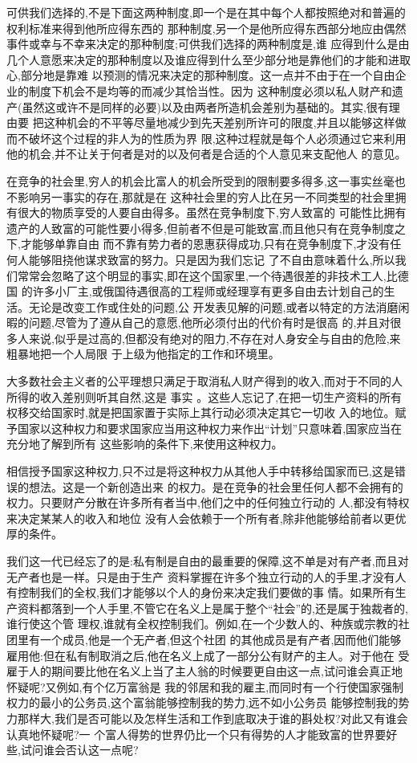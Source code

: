 ﻿\documentclass[12pt]{article}
\begin{document}
可供我们选择的,不是下面这两种制度,即一个是在其中每个人都按照绝对和普遍的权利标准来得到他所应得东西的
那种制度,另一个是他所应得东西部分地应由偶然事件或幸与不幸来决定的那种制度;可供我们选择的两种制度是,谁
应得到什么是由几个人意愿来决定的那种制度以及谁应得到什么至少部分地是靠他们的才能和进取心,部分地是靠难
以预测的情况来决定的那种制度。这一点并不由于在一个自由企业的制度下机会不是均等的而减少其恰当性。因为
这种制度必须以私人财产和遗产(虽然这或许不是同样的必要)以及由两者所造机会差别为基础的。其实,很有理由要
把这种机会的不平等尽量地减少到先天差别所许可的限度,并且以能够这样做而不破坏这个过程的非人为的性质为界
限,这种过程就是每个人必须通过它来利用他的机会,并不让关于何者是对的以及何者是合适的个人意见来支配他人
的意见。

在竞争的社会里,穷人的机会比富人的机会所受到的限制要多得多,这一事实丝毫也不影响另一事实的存在,那就是在
这种社会里的穷人比在另一不同类型的社会里拥有很大的物质享受的人要自由得多。虽然在竞争制度下,穷人致富的
可能性比拥有遗产的人致富的可能性要小得多,但前者不但是可能致富,而且他只有在竞争制度之下,才能够单靠自由
而不靠有势力者的恩惠获得成功,只有在竞争制度下,才没有任何人能够阻挠他谋求致富的努力。只是因为我们忘记
了不自由意味着什么,所以我们常常会忽略了这个明显的事实,即在这个国家里,一个待遇很差的非技术工人,比德国
的许多小厂主,或俄国待遇很高的工程师或经理享有更多自由去计划自己的生活。无论是改变工作或住处的问题,公
开发表见解的问题,或者以特定的方法消磨闲暇的问题,尽管为了遵从自己的意愿,他所必须付出的代价有时是很高
的,并且对很多人来说,似乎是过高的,但都没有绝对的阻力,不存在对人身安全与自由的危险,来粗暴地把一个人局限
于上级为他指定的工作和环境里。

大多数社会主义者的公平理想只满足于取消私人财产得到的收入,而对于不同的人所得的收入差别则听其自然,这是
事实 。这些人忘记了,在把一切生产资料的所有权移交给国家时,就是把国家置于实际上其行动必须决定其它一切收
入的地位。赋予国家以这种权力和要求国家应当用这种权力来作出``计划''只意味着,国家应当在充分地了解到所有
这些影响的条件下,来使用这种权力。

相信授予国家这种权力,只不过是将这种权力从其他人手中转移给国家而已,这是错误的想法。这是一个新创造出来
的权力。是在竞争的社会里任何人都不会拥有的权力。只要财产分散在许多所有者当中,他们之中的任何独立行动的
人,都没有特权来决定某某人的收入和地位 \myrule 没有人会依赖于一个所有者,除非他能够给前者以更优厚的条件。

我们这一代已经忘了的是:私有制是自由的最重要的保障,这不单是对有产者,而且对无产者也是一样。只是由于生产
资料掌握在许多个独立行动的人的手里,才没有人有控制我们的全权,我们才能够以个人的身份来决定我们要做的事
情。如果所有生产资料都落到一个人手里,不管它在名义上是属于整个``社会''的,还是属于独裁者的,谁行使这个管
理权,谁就有全权控制我们。例如,在一个少数人的、种族或宗教的社团里有一个成员,他是一个无产者,但这个社团
的其他成员是有产者,因而他们能够雇用他:但在私有制取消之后,他在名义上成了一部分公有财产的主人。对于他在
受雇于人的期间要比他在名义上当了主人翁的时候要更自由这一点,试问谁会真正地怀疑呢?又例如,有个亿万富翁是
我的邻居和我的雇主,而同时有一个行使国家强制权力的最小的公务员,这个富翁能够控制我的势力,远不如小公务员
能够控制我的势力那样大,我们是否可能以及怎样生活和工作到底取决于谁的斟处权?对此又有谁会认真地怀疑呢?一
个富人得势的世界仍比一个只有得势的人才能致富的世界要好些,试问谁会否认这一点呢?
\end{document}
